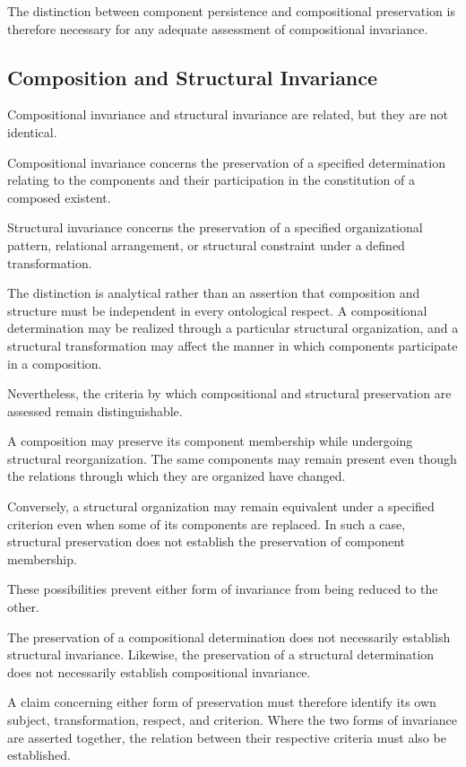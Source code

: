 The distinction between component persistence and
compositional preservation is therefore necessary for
any adequate assessment of compositional invariance.

\subsection{Composition and Structural Invariance}

Compositional invariance and structural invariance are
related, but they are not identical.

Compositional invariance concerns the preservation of
a specified determination relating to the components
and their participation in the constitution of a
composed existent.

Structural invariance concerns the preservation of
a specified organizational pattern, relational arrangement,
or structural constraint under a defined transformation.

The distinction is analytical rather than an assertion
that composition and structure must be independent in
every ontological respect. A compositional determination
may be realized through a particular structural organization,
and a structural transformation may affect the manner
in which components participate in a composition.

Nevertheless, the criteria by which compositional and
structural preservation are assessed remain distinguishable.

A composition may preserve its component membership
while undergoing structural reorganization. The same
components may remain present even though the relations
through which they are organized have changed.

Conversely, a structural organization may remain equivalent
under a specified criterion even when some of its components
are replaced. In such a case, structural preservation
does not establish the preservation of component membership.

These possibilities prevent either form of invariance
from being reduced to the other.

The preservation of a compositional determination does
not necessarily establish structural invariance. Likewise,
the preservation of a structural determination does
not necessarily establish compositional invariance.

A claim concerning either form of preservation must
therefore identify its own subject, transformation,
respect, and criterion. Where the two forms of invariance
are asserted together, the relation between their respective
criteria must also be established.

